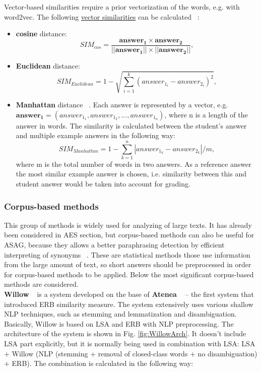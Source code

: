 Vector-based similarities require a prior vectorization of the words, e.g. with word2vec. The following \underline{vector similarities} can be calculated ~\cite{Klein}:

\begin{itemize}
\item \textbf{cosine} distance:
\begin{equation} \label{eq:cos}
SIM_{cos} = \frac{\pmb{answer_1} \times \pmb{answer_2}}{||\pmb{answer_1}|| \times ||\pmb{answer_2}||},
\end{equation}
\item \textbf{Euclidean} distance:
\begin{equation} \label{eq:Euclidean}
SIM_{Euclidean} = 1 - \sqrt{\sum^k_{i=1}(answer_{1_i} - answer_{2_i})^2},
\end{equation}
\item \textbf{Manhattan} distance ~\cite{Li}. Each answer is represented by a vector, e.g. $ \pmb{answer_1} = (answer_{1_1}, answer_{1_2},..., answer_{1_n})$, where n is a length of the answer in words. The similarity is calculated between the student's answer and multiple example answers in the following way:
\begin{equation} \label{eq:Manhattan}
SIM_{Manhattan} = 1 - \sum^n_{k=1}|answer_{1_k} - answer_{2_k}| / m,
\end{equation}
where m is the total number of words in two answers. As a reference answer the most similar example answer is chosen, i.e. similarity between this and student answer would be taken into account for grading.
\end{itemize} 


\subsubsection{Corpus-based methods}

This group of methods is widely used for analyzing of large texts. It has already been considered in AES section, but corpus-based methods can also be useful for ASAG, because they allows a better paraphrasing detection by efficient interpreting of synonyms ~\cite{Burrows}. These are statistical methods those use information from the large amount of text, so short answers should be preprocessed in order for corpus-based methods to be applied. Below the most significant corpus-based methods are considered.\\

\textbf{Willow} ~\cite{Willow} is a system developed on the base of \textbf{Atenea} ~\cite{ERB} -- the first system that introduced ERB similarity measure. The system extensively uses various shallow NLP techniques, such as stemming and lemmatization and disambiguation. Basically, Willow is based on LSA and ERB with NLP preprocessing. The architecture of the system is shown in Fig. \ref{fig:WillowArch}. It doesn't include LSA part explicitly, but it is normally being used in combination with LSA: LSA + Willow (NLP (stemming + removal of closed-class words + no disambiguation) + ERB). The combination is calculated in the following way:

